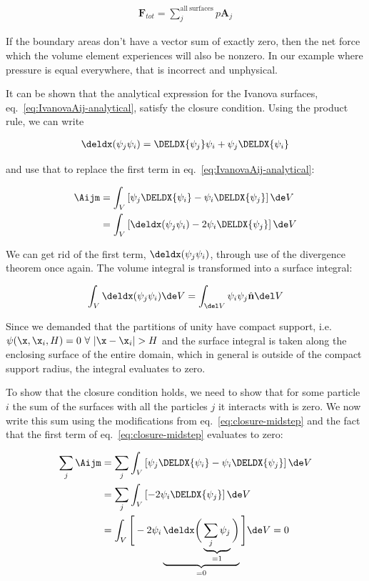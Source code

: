 \begin{align}
 \mathbf{F}_{tot} = \sum_j^{\mathrm{all\ surfaces}} p \mathbf{A}_j
\end{align}

If the boundary areas don't have a vector sum of exactly zero, then the net force which the volume
element experiences will also be nonzero. In our example where pressure is equal everywhere, that
is incorrect and unphysical.

It can be shown that the analytical expression for the Ivanova surfaces,
eq.~\ref{eq:IvanovaAij-analytical}, satisfy the closure condition. Using the product rule, we can
write

\begin{align}
 \deldx (\psi_j \psi_i) = \DELDX{\psi_j} \psi_i + \psi_j \DELDX{\psi_i}
\end{align}

and use that to replace the first term in eq.~\ref{eq:IvanovaAij-analytical}:

\begin{align}
   \Aijm &= \int_V \left[ \psi_j \DELDX{\psi_i} - \psi_i \DELDX{\psi_j}  \right] \de V  \\
&= \int_V \left[ \deldx(\psi_j \psi_i) - 2 \psi_i \DELDX{\psi_j}  \right] \de V
\label{eq:closure-midstep}
\end{align}

We can get rid of the first term, $\deldx(\psi_j \psi_i)$, through use of the divergence theorem
once again. The volume integral is transformed into a surface integral:

\begin{align}
    \int_V  \deldx(\psi_j \psi_i) \de V = \int_{\del V} \psi_i \psi_j \hat{\mathbf{n}} \del V
\end{align}

Since we demanded that the partitions of unity have compact support, i.e. $\psi(\x, \x_i, H) = 0 \
\forall \ |\x - \x_i| > H$ and the surface integral is taken along the enclosing surface of the
entire domain, which in general is outside of the compact support radius, the integral evaluates to
zero.

To show that the closure condition holds, we need to show that for some particle $i$ the sum of the
surfaces with all the particles $j$ it interacts with is zero. We now write this sum using the
modifications from eq.~\ref{eq:closure-midstep} and the fact that the first term of
eq.~\ref{eq:closure-midstep} evaluates to zero:


\begin{align}
   \sum_j \Aijm &=
   \sum_j \int_V \left[ \psi_j \DELDX{\psi_i} - \psi_i \DELDX{\psi_j}  \right] \de V  \\
&= \sum_j \int_V \left[- 2 \psi_i \DELDX{\psi_j}  \right] \de V \\
&= \int_V \Bigg[- 2 \psi_i
    \underbrace{\deldx
        \bigg( \underbrace{\sum_j \psi_j}_{= 1} \bigg)
    }_{= 0}
    \Bigg] \de V  = 0
\end{align}


